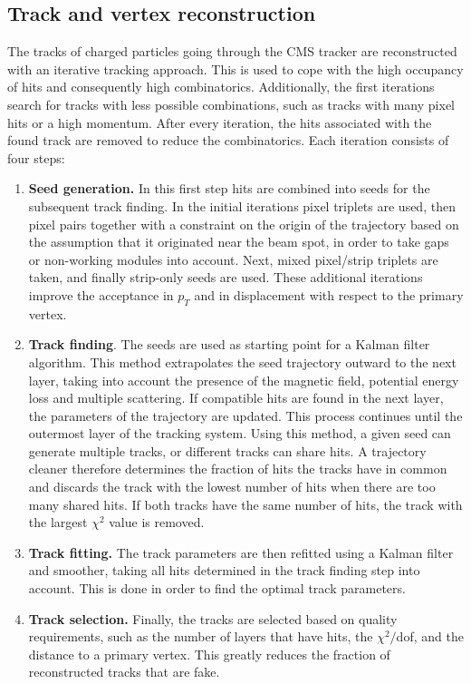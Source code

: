 \subsection{Track and vertex reconstruction}
\label{sec:tracking}

The tracks of charged particles going through the \ac{CMS} tracker are reconstructed with an iterative tracking approach. This is used to cope with the high occupancy of hits and consequently high combinatorics. Additionally, the first iterations search for tracks with less possible combinations, such as tracks with many pixel hits or a high momentum. After every iteration, the hits associated with the found track are removed to reduce the combinatorics. Each iteration consists of four steps:
\begin{enumerate}
 \item \textbf{Seed generation.} In this first step hits are combined into seeds for the subsequent track finding. In the initial iterations pixel triplets are used, then pixel pairs together with a constraint on the origin of the trajectory based on the assumption that it originated near the beam spot, in order to take gaps or non-working modules into account. Next, mixed pixel/strip triplets are taken, and finally strip-only seeds are used. These additional iterations improve the acceptance in $p_T$ and in displacement with respect to the primary vertex.
 \item \textbf{Track finding}. The seeds are used as starting point for a Kalman filter algorithm. This method extrapolates the seed trajectory outward to the next layer, taking into account the presence of the magnetic field, potential energy loss and multiple scattering. If compatible hits are found in the next layer, the parameters of the trajectory are updated. This process continues until the outermost layer of the tracking system. Using this method, a given seed can generate multiple tracks, or different tracks can share hits. A trajectory cleaner therefore determines the fraction of hits the tracks have in common and discards the track with the lowest number of hits when there are too many shared hits. If both tracks have the same number of hits, the track with the largest $\chi^2$ value is removed.
 \item \textbf{Track fitting.} The track parameters are then refitted using a Kalman filter and smoother, taking all hits determined in the track finding step into account. This is done in order to find the optimal track parameters.
 \item \textbf{Track selection.} Finally, the tracks are selected based on quality requirements, such as the number of layers that have hits, the $\chi^2/$dof, and the distance to a primary vertex. This greatly reduces the fraction of reconstructed tracks that are fake.
\end{enumerate}

